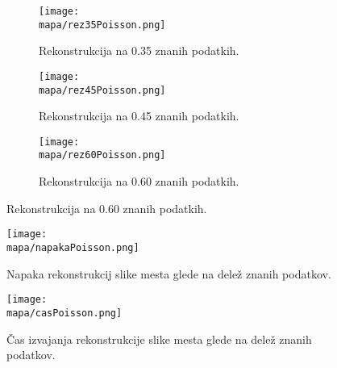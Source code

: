 \renewcommand{\mapa}{Poglavja/Slike/kompleksnost/kompleksna grayscale 300}

\begin{figure}[H]
    \begin{subfigure}{0.32\linewidth}
        \texttt{[image: \\mapa/rez35Poisson.png]}
        \caption{Rekonstrukcija na 0.35 znanih podatkih.}
    \end{subfigure}
    \hfill
    \begin{subfigure}{0.32\linewidth}
        \texttt{[image: \\mapa/rez45Poisson.png]}
        \caption{Rekonstrukcija na 0.45 znanih podatkih.}
    \end{subfigure}
    \hfill
    \begin{subfigure}{0.32\linewidth}
        \texttt{[image: \\mapa/rez60Poisson.png]}
        \caption{Rekonstrukcija na 0.60 znanih podatkih.}
    \end{subfigure}
\end{figure}

\begin{figure}[H]
    \texttt{[image: \\mapa/napakaPoisson.png]}
    \caption{Napaka rekonstrukcij slike mesta glede na delež znanih podatkov.}
\end{figure}

\begin{figure}[H]
    \texttt{[image: \\mapa/casPoisson.png]}
    \caption{Čas izvajanja rekonstrukcije slike mesta glede na delež znanih podatkov.}
\end{figure} 
